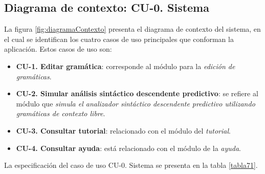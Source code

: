 \subsection{Diagrama de contexto: CU-0. Sistema}

La figura \ref{fig:diagramaContexto}  presenta el diagrama de contexto del sistema, en el cual se identifican los cuatro casos de uso principales que conforman la aplicación. Estos casos de uso son:
\begin{itemize}
    \item \textbf{CU-1. Editar gramática}: corresponde al módulo para la \textit{edición de gramáticas}.
    \item \textbf{CU-2. Simular análisis sintáctico descendente predictivo}: se refiere al módulo que \textit{simula el analizador sintáctico descendente predictivo utilizando gramáticas de contexto libre}.    
    \item \textbf{CU-3. Consultar tutorial}: relacionado con el módulo del \textit{tutorial}.    
    \item \textbf{CU-4. Consultar ayuda}: está relacionado con el módulo de la \textit{ayuda}.
\end{itemize}



La especificación del caso de uso CU-0. Sistema se presenta en la tabla \ref{tabla71}.

